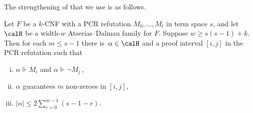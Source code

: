 \documentclass{toc}
\begin{document}
The strengthening of  that we use is as follows.

\begin{lemma}\label{lem:main-bis}
Let $F$ be a $k$-CNF with a PCR refutation $M_0,\ldots,M_t$
in term space $s$,
and let $\calH$ be a width-$w$ Atserias--Dalmau family for $F$.
Suppose $w \ge s(s-1)+k$.
Then for each $m \le s-1$ there is~$\alpha \in \calH$ 
and a proof interval $[i,j]$ in the PCR refutation such that
\begin{enumerate}[(i)]
\item 
$\alpha \Vdash M_{i}$ and  $\alpha \Vdash \neg M_{j}$\,,
\item 
$\alpha$ guarantees $m$ non-zeroes in $[i,j]$,
\item 
$|\alpha| \le \displaystyle{2\sum_{r=0}^{m-1} (s - 1-r)}$.
\end{enumerate}
\end{lemma}
\end{document}
